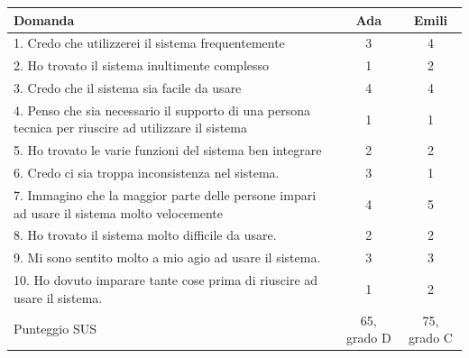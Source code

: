 \documentclass[../Report.tex]{subfiles}
\begin{document}
    \begin{table}[H]
        \begin{tabular}{|p{10cm}|c|c|}
            \hline
            \textbf{Domanda} & \textbf{Ada} & \textbf{Emili}\\
            \hline
            1. Credo che utilizzerei il sistema frequentemente & 3 & 4\\
            \hline
            2. Ho trovato il sistema inultimente complesso & 1 & 2 \\
            \hline
            3. Credo che il sistema sia facile da usare & 4 & 4 \\
            \hline
            4. Penso che sia necessario il supporto di una persona tecnica per riuscire ad utilizzare il sistema & 1 & 1 \\
            \hline
            5. Ho trovato le varie funzioni del sistema ben integrare & 2 & 2 \\
            \hline
            6. Credo ci sia troppa inconsistenza nel sistema. & 3 & 1\\
            \hline
            7. Immagino che la maggior parte delle persone impari ad usare il sistema molto velocemente & 4 & 5 \\
            \hline
            8. Ho trovato il sistema molto difficile da usare. & 2 & 2\\
            \hline
            9. Mi sono sentito molto a mio agio ad usare il sistema. & 3 & 3\\
            \hline
            10. Ho dovuto imparare tante cose prima di riuscire ad usare il sistema. & 1 & 2 \\ 
            \hline
            Punteggio SUS & 65, grado D & 75, grado C \\
            \hline
        \end{tabular}
    \end{table}
\end{document}
